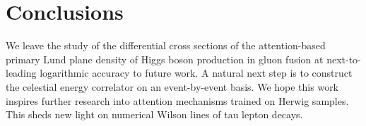 \section{Conclusions}\label{sec:conclusions}

We leave the study of the differential cross sections of the
attention-based primary Lund plane density of Higgs boson production in
gluon fusion at next-to-leading logarithmic accuracy to future work. A
natural next step is to construct the celestial energy correlator on an
event-by-event basis. We hope this work inspires further research into
attention mechanisms trained on Herwig samples. This sheds new light on
numerical Wilson lines of tau lepton decays.

